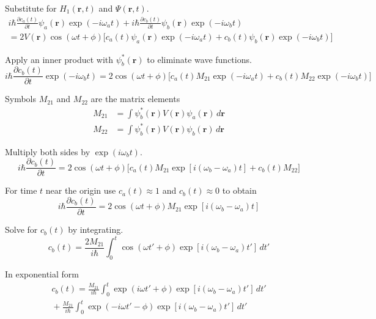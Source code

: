 Substitute for $H_1(\mathbf r,t)$ and $\Psi(\mathbf r,t)$.
\begin{multline*}
i\hbar\frac{\partial c_a(t)}{\partial t}\psi_a(\mathbf r)\exp(-i\omega_at)
+i\hbar\frac{\partial c_b(t)}{\partial t}\psi_b(\mathbf r)\exp(-i\omega_bt)
\\
{}=2V(\mathbf r)\cos(\omega t+\phi)
\biggl[
c_a(t)\psi_a(\mathbf r)\exp(-i\omega_at)+c_b(t)\psi_b(\mathbf r)\exp(-i\omega_bt)
\biggr]
\end{multline*}

Apply an inner product with $\psi_b^*(\mathbf r)$ to eliminate wave functions.
\begin{equation*}
i\hbar\frac{\partial c_b(t)}{\partial t}\exp(-i\omega_bt)
=2\cos(\omega t+\phi)
\biggl[
c_a(t)M_{21}\exp(-i\omega_at)+
c_b(t)M_{22}\exp(-i\omega_bt)
\biggr]
\end{equation*}

Symbols $M_{21}$ and $M_{22}$ are the matrix elements
\begin{align*}
M_{21}&=\int\psi_b^*(\mathbf r)V(\mathbf r)\psi_a(\mathbf r)\,d\mathbf r
\\
M_{22}&=\int\psi_b^*(\mathbf r)V(\mathbf r)\psi_b(\mathbf r)\,d\mathbf r
\end{align*}

Multiply both sides by $\exp(i\omega_bt)$.
\begin{equation*}
i\hbar\frac{\partial c_b(t)}{\partial t}
=2\cos(\omega t+\phi)
\biggl[
c_a(t)M_{21}\exp[i(\omega_b-\omega_a)t]+c_b(t)M_{22}
\biggr]
\end{equation*}

For time $t$ near the origin use $c_a(t)\approx1$ and $c_b(t)\approx0$ to obtain
\begin{equation*}
i\hbar\frac{\partial c_b(t)}{\partial t}
=2\cos(\omega t+\phi)M_{21}\exp[i(\omega_b-\omega_a)t]
\end{equation*}

Solve for $c_b(t)$ by integrating.
\begin{equation*}
c_b(t)=\frac{2M_{21}}{i\hbar}
\int_0^t\cos(\omega t'+\phi)\exp[i(\omega_b-\omega_a)t']\,dt'
\end{equation*}

In exponential form
\begin{multline*}
c_b(t)=\frac{M_{21}}{i\hbar}
\int_0^t
\exp(i\omega t'+\phi)\exp[i(\omega_b-\omega_a)t']\,dt'
\\
{}+\frac{M_{21}}{i\hbar}
\int_0^t
\exp(-i\omega t'-\phi)\exp[i(\omega_b-\omega_a)t']\,dt'
\end{multline*}

